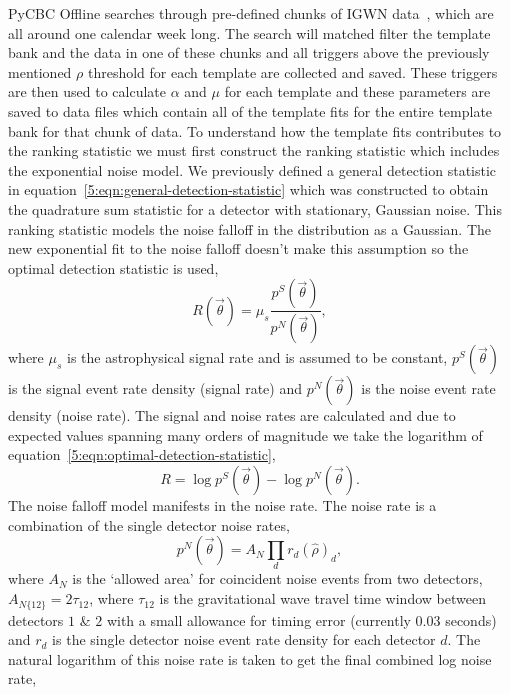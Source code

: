 PyCBC Offline searches through pre-defined chunks of IGWN data~\cite{gwtc3:2023}, which are all around one calendar week long. The search will matched filter the template bank and the data in one of these chunks and all triggers above the previously mentioned $\rho$ threshold for each template are collected and saved. These triggers are then used to calculate $\alpha$ and $\mu$ for each template and these parameters are saved to data files which contain all of the template fits for the entire template bank for that chunk of data.
%
% 
To understand how the template fits contributes to the ranking statistic we must first construct the ranking statistic which includes the exponential noise model. We previously defined a general detection statistic in equation~\ref{5:eqn:general-detection-statistic} which was constructed to obtain the quadrature sum statistic for a detector with stationary, Gaussian noise. This ranking statistic models the noise falloff in the distribution as a Gaussian. The new exponential fit to the noise falloff doesn't make this assumption so the optimal detection statistic is used,
%
\begin{equation}
    R(\Vec{\theta}) = \mu_{s} \frac{p^{S}(\Vec{\theta})}{p^{N}(\Vec{\theta})} ,
    \label{5:eqn:optimal-detection-statistic}
\end{equation}
where $\mu_{s}$ is the astrophysical signal rate and is assumed to be constant, $p^{S}(\Vec{\theta})$ is the signal event rate density (signal rate) and $p^{N}(\Vec{\theta})$ is the noise event rate density (noise rate). The signal and noise rates are calculated and due to expected values spanning many orders of magnitude we take the logarithm of equation~\ref{5:eqn:optimal-detection-statistic},
%
\begin{equation}
    R = \log p^{S}(\Vec{\theta}) - \log p^{N}(\Vec{\theta}).
    \label{5:eqn:signal-minus-noise-rate}
\end{equation}
The noise falloff model manifests in the noise rate. The noise rate is a combination of the single detector noise rates,
%
\begin{equation}
    p^{N}(\Vec{\theta}) = A_{N} \prod_{d} r_{d}(\hat{\rho})_{d} ,
\label{5:eqn:comb-noise-rate}
\end{equation}
%
where $A_{N}$ is the `allowed area' for coincident noise events from two detectors, $A_{N\{12\}} = 2\tau_{12}$, where $\tau_{12}$ is the gravitational wave travel time window between detectors $1$ \& $2$ with a small allowance for timing error (currently $0.03$ seconds) and $r_{d}$ is the single detector noise event rate density for each detector $d$. The natural logarithm of this noise rate is taken to get the final combined log noise rate,
